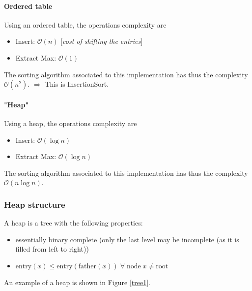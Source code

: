 \documentclass[11pt,a4paper]{article}
\begin{document}
\paragraph*{Ordered table} Using an ordered table, the operations complexity are \begin{itemize}
\item Insert: $\mathcal{O}(n)$ \textit{$[$cost of shifting the entries$]$}
\item Extract Max: $\mathcal{O}(1)$
\end{itemize}
The sorting algorithm associated to this implementation has thus the complexity $\mathcal{O} (n^2)$. \newline
$\Rightarrow$ This is InsertionSort.

\paragraph*{"Heap"} Using a heap, the operations complexity are \begin{itemize}
\item Insert: $\mathcal{O}(\log n)$
\item Extract Max: $\mathcal{O}(\log n)$
\end{itemize}
The sorting algorithm associated to this implementation has thus the complexity $\mathcal{O} (n \log n)$.

\subsubsection*{Heap structure}

A heap is a tree with the following properties:
\begin{itemize}
\item essentially binary complete (only the last level may be incomplete (as it is filled from left to right))
\item $\text{entry}(x) \leq \text{entry}(\text{father}(x)) \; \forall \; \text{node} \; x \neq \text{root}$
\end{itemize}
An example of a heap is shown in Figure \ref{tree1}.
\end{document}

